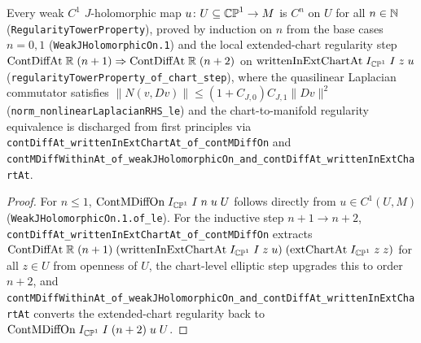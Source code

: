 \begin{theorem}
\label{cert_tower}
\leanok
{}
Every weak $C^1$ $J$-holomorphic map $u\colon U\subseteq\mathbb{CP}^1\to M$ is $C^n$ on $U$ for all $n\in\mathbb{N}$
(\texttt{RegularityTowerProperty}), proved by induction on $n$ from the base cases $n=0,1$
(\texttt{WeakJHolomorphicOn.1}) and the local extended-chart regularity step
$\mathrm{ContDiffAt}\;\mathbb{R}\;(n+1)\Rightarrow\mathrm{ContDiffAt}\;\mathbb{R}\;(n+2)$ on
$\mathrm{writtenInExtChartAt}\;I_{\mathbb{CP}^1}\;I\;z\;u$ (\texttt{regularityTowerProperty\_of\_chart\_step}),
where the quasilinear Laplacian commutator satisfies $\|N(v,Dv)\|\le(1+C_{J,0})C_{J,1}\|Dv\|^2$
(\texttt{norm\_nonlinearLaplacianRHS\_le}) and the chart-to-manifold regularity equivalence
is discharged from first principles via \texttt{contDiffAt\_writtenInExtChartAt\_of\_contMDiffOn} and
\texttt{contMDiffWithinAt\_of\_weakJHolomorphicOn\_and\_contDiffAt\_writtenInExtChartAt}.
\end{theorem}
\begin{proof}\leanok For $n\le 1$, $\mathrm{ContMDiffOn}\;I_{\mathbb{CP}^1}\;I\;n\;u\;U$ follows directly from
$u\in C^1(U,M)$ (\texttt{WeakJHolomorphicOn.1.of\_le}). For the inductive step $n+1\to n+2$,
\texttt{contDiffAt\_writtenInExtChartAt\_of\_contMDiffOn} extracts
$\mathrm{ContDiffAt}\;\mathbb{R}\;(n+1)\;(\mathrm{writtenInExtChartAt}\;I_{\mathbb{CP}^1}\;I\;z\;u)\;(\mathrm{extChartAt}\;I_{\mathbb{CP}^1}\;z\;z)$
for all $z\in U$ from openness of $U$, the chart-level elliptic step upgrades this to order $n+2$, and
\texttt{contMDiffWithinAt\_of\_weakJHolomorphicOn\_and\_contDiffAt\_writtenInExtChartAt} converts the
extended-chart regularity back to $\mathrm{ContMDiffOn}\;I_{\mathbb{CP}^1}\;I\;(n+2)\;u\;U$.\end{proof}

